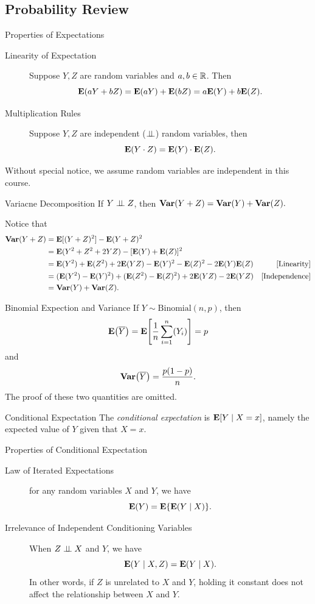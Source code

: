 \subsection{Probability Review}
\begin{thm}{Properties of Expectations}
	\begin{description}
		\item[Linearity of Expectation] Suppose $Y,Z$ are random variables and $a,b\in\mathbb{R}$. Then \[\vb{E}(aY+bZ)= \vb{E}(aY)+\vb{E}(bZ)=a\vb{E}(Y)+b\vb{E}(Z).\] 
     	\item[Multiplication Rules] Suppose $Y,Z$ are independent ($\perp\!\!\!\perp$) random variables, then \[\vb{E}(Y\cdot Z)=\vb{E}(Y)\cdot\vb{E}(Z).\]
	\end{description}
\end{thm}
\begin{rmk}
	Without special notice, we assume random variables are independent in this course.	
\end{rmk}
\begin{thm}{Variacne Decomposition}
	If $Y\perp\!\!\!\perp Z$, then $\vb{Var}(Y+Z)=\vb{Var}(Y)+\vb{Var}(Z).$	
\end{thm}
\begin{prf}
	Notice that  \begin{align*}\vb{Var}(Y+Z)&=\vb{E}[(Y+Z)^2]- \vb{E}(Y+Z)^2\\&=\vb{E}(Y^2+Z^2+2YZ)-[\vb{E}(Y)+\vb{E}(Z)]^2 \\
    &=\vb{E}(Y^2)+\vb{E}(Z^2)+2\vb{E}(YZ)-\vb{E}(Y)^2-\vb{E}(Z)^2-2\vb{E}(Y)\vb{E}(Z)&[\text{Linearity}]\\&=(\vb{E}(Y^2)-\vb{E}(Y)^2)+(\vb{E}(Z^2)-\vb{E}(Z)^2)+2\vb{E}(YZ)-2\vb{E}(YZ)&[\text{Independence}]\\&=\vb{Var}(Y)+\vb{Var}(Z).\end{align*}
\end{prf}
\begin{thm}{Binomial Expection and Variance}
	If $Y\sim\text{Binomial}(n,p)$, then \[\vb{E}\qty(\overline{Y})= \vb{E}\qty[\dfrac{1}{n}\sum_{i=1}^n(Y_i)]=p\] and \[\vb{Var}\qty(\overline{Y})=\dfrac{p(1-p)}{n}.\] The proof of these two quantities are omitted. 
\end{thm}
\begin{df}{Conditional Expectation}
    The \textit{conditional expectation} is $\vb{E}[Y\mid X=x]$, namely the expected value of $Y$ given that $X=x$.
\end{df}
\begin{thm}{Properties of Conditional Expectation}
	\begin{description}
		\item[Law of Iterated Expectations] for any random variables $X$ and $Y$, we have \[\vb{E}(Y)=\vb{E}\qty{\vb{E}(Y\mid X)}.\]
		\item[Irrelevance of Independent Conditioning Variables] When $Z\perp\!\!\!\perp X$ and $Y$, we have \[\vb{E}(Y\mid X,Z)=\vb{E}(Y\mid X).\] In other words, if $Z$ is unrelated to $X$ and $Y$, holding it constant does not affect the relationship between $X$ and $Y$.
	\end{description}
\end{thm}
